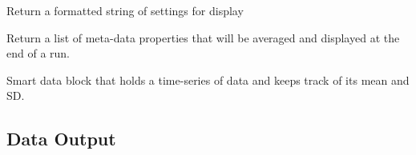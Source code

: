 \documentclass[letterpaper,10pt,english]{sphinxmanual}
\begin{document}
\begin{fulllineitems}
\begin{quote}
\begin{quote}
\begin{description}
\end{description}\end{quote}
\end{quote}

\begin{fulllineitems}
\label{api-doc/mosaic.processing:mosaic.cusumPlus.cusumPlus.formatsettings}
Return a formatted string of settings for display

\end{fulllineitems}


\begin{fulllineitems}
\label{api-doc/mosaic.processing:mosaic.cusumPlus.cusumPlus.mdAveragePropertiesList}
Return a list of meta-data properties that will be averaged 
and displayed at the end of a run.

\end{fulllineitems}


\end{fulllineitems}


\begin{fulllineitems}
\label{api-doc/mosaic.processing:mosaic.cusumPlus.datblock}
Smart data block that holds a time-series of data and keeps track
of its mean and SD.

\end{fulllineitems}



\subsection{Data Output}
\label{api-doc/mosaic.output::doc}\label{api-doc/mosaic.output:data-output}
\end{document}
